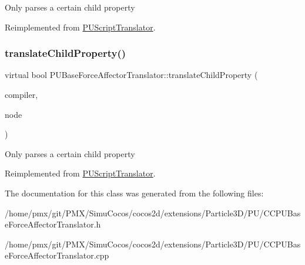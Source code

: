 Only parses a certain child property 

Reimplemented from \hyperlink{classPUScriptTranslator_a0374d83a8a04e57918975d525e0f8fe8}{P\+U\+Script\+Translator}.

\mbox{\label{classPUBaseForceAffectorTranslator_aaf7589c803d4e1a77903b5da224907c1}} 
\subsubsection{\texorpdfstring{translate\+Child\+Property()}{translateChildProperty()}\hspace{0.1cm}{\footnotesize\ttfamily [2/2]}}
{\footnotesize\ttfamily virtual bool P\+U\+Base\+Force\+Affector\+Translator\+::translate\+Child\+Property (\begin{DoxyParamCaption}\item[{\hyperlink{classPUScriptCompiler}{P\+U\+Script\+Compiler} $\ast$}]{compiler,  }\item[{\hyperlink{classPUAbstractNode}{P\+U\+Abstract\+Node} $\ast$}]{node }\end{DoxyParamCaption})\hspace{0.3cm}{\ttfamily [virtual]}}

Only parses a certain child property 

Reimplemented from \hyperlink{classPUScriptTranslator_a0374d83a8a04e57918975d525e0f8fe8}{P\+U\+Script\+Translator}.



The documentation for this class was generated from the following files\+:\begin{DoxyCompactItemize}
\item 
/home/pmx/git/\+P\+M\+X/\+Simu\+Cocos/cocos2d/extensions/\+Particle3\+D/\+P\+U/C\+C\+P\+U\+Base\+Force\+Affector\+Translator.\+h\item 
/home/pmx/git/\+P\+M\+X/\+Simu\+Cocos/cocos2d/extensions/\+Particle3\+D/\+P\+U/C\+C\+P\+U\+Base\+Force\+Affector\+Translator.\+cpp\end{DoxyCompactItemize}
